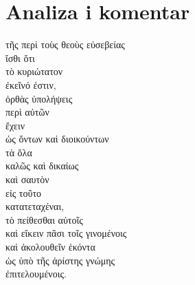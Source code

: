 \section*{Analiza i komentar}


{\large
\begin{greek}
\noindent τῆς περὶ τοὺς θεοὺς εὐσεβείας \\
ἴσθι ὅτι \\
\tabto{2em} τὸ κυριώτατον \\
\tabto{2em} ἐκεῖνό ἐστιν, \\
\tabto{4em} ὀρθὰς ὑπολήψεις \\
\tabto{6em} περὶ αὐτῶν \\
\tabto{4em} ἔχειν \\
\tabto{6em} ὡς ὄντων καὶ διοικούντων \\
\tabto{8em} τὰ ὅλα \\
\tabto{6em} καλῶς καὶ δικαίως \\
\tabto{4em} καὶ σαυτὸν \\
\tabto{6em} εἰς τοῦτο \\
\tabto{4em} κατατεταχέναι, \\

\tabto{4em} τὸ πείθεσθαι αὐτοῖς \\
\tabto{4em} καὶ εἴκειν πᾶσι τοῖς γινομένοις \\
\tabto{4em} καὶ ἀκολουθεῖν ἑκόντα \\
\tabto{6em} ὡς ὑπὸ τῆς ἀρίστης γνώμης \\
\tabto{4em} ἐπιτελουμένοις. \\

\end{greek}
}

